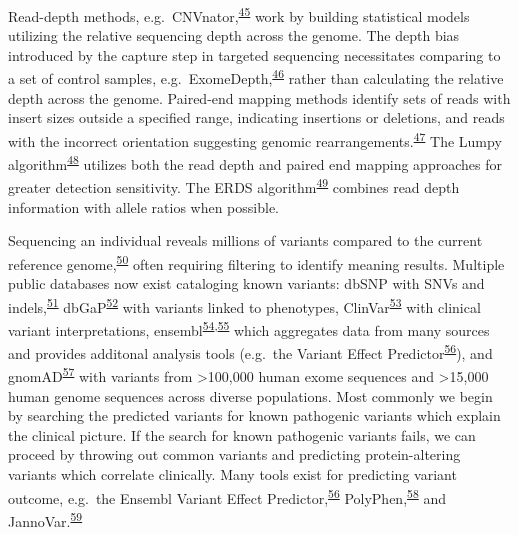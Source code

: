 \documentclass[11pt,letterpaper]{book}
\begin{document}
Read-depth methods, e.g.~CNVnator,\textsuperscript{\protect\hyperlink{ref-abyzov:2011aa}{45}} work by building statistical models utilizing the relative sequencing depth across the genome.
The depth bias introduced by the capture step in targeted sequencing necessitates comparing to a set of control samples, e.g.~ExomeDepth,\textsuperscript{\protect\hyperlink{ref-plagnol:2012aa}{46}} rather than calculating the relative depth across the genome.
Paired-end mapping methods identify sets of reads with insert sizes outside a specified range, indicating insertions or deletions, and reads with the incorrect orientation suggesting genomic rearrangements.\textsuperscript{\protect\hyperlink{ref-korbel:2007aa}{47}}
The Lumpy algorithm\textsuperscript{\protect\hyperlink{ref-layer:2014aa}{48}} utilizes both the read depth and paired end mapping approaches for greater detection sensitivity.
The ERDS algorithm\textsuperscript{\protect\hyperlink{ref-zhu:2012aa}{49}} combines read depth information with allele ratios when possible.

Sequencing an individual reveals millions of variants compared to the current reference genome,\textsuperscript{\protect\hyperlink{ref-auton:2015aa}{50}} often requiring filtering to identify meaning results.
Multiple public databases now exist cataloging known variants: dbSNP with SNVs and indels,\textsuperscript{\protect\hyperlink{ref-sherry:1999aa}{51}} dbGaP\textsuperscript{\protect\hyperlink{ref-mailman:2007aa}{52}} with variants linked to phenotypes, ClinVar\textsuperscript{\protect\hyperlink{ref-landrum:2014aa}{53}} with clinical variant interpretations, ensembl\textsuperscript{\protect\hyperlink{ref-hubbard:2002aa}{54},\protect\hyperlink{ref-yates:2020aa}{55}} which aggregates data from many sources and provides additonal analysis tools (e.g.~the Variant Effect Predictor\textsuperscript{\protect\hyperlink{ref-mclaren:2016aa}{56}}), and gnomAD\textsuperscript{\protect\hyperlink{ref-karczewski:2019aa}{57}} with variants from \textgreater100,000 human exome sequences and \textgreater15,000 human genome sequences across diverse populations.
Most commonly we begin by searching the predicted variants for known pathogenic variants which explain the clinical picture.
If the search for known pathogenic variants fails, we can proceed by throwing out common variants and predicting protein-altering variants which correlate clinically.
Many tools exist for predicting variant outcome, e.g.~the Ensembl Variant Effect Predictor,\textsuperscript{\protect\hyperlink{ref-mclaren:2016aa}{56}} PolyPhen,\textsuperscript{\protect\hyperlink{ref-adzhubei:2013aa}{58}} and JannoVar.\textsuperscript{\protect\hyperlink{ref-jager:2014aa}{59}}
\end{document}

